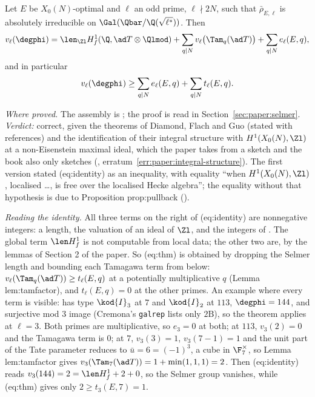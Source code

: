 \begin{sloppypar}
\begin{theorem}\label{thm:paper:main}
Let $E$ be $X_0(N)$-optimal and $\ell$ an odd prime, $\ell\nmid2N$, such that $\bar\rho_{E,\ell}$ is absolutely irreducible on $\Gal(\Qbar/\Q(\sqrt{\ell^*}))$. Then
\begin{equation}\label{eq:paper:identity}
v_\ell(\degphi)=\len_{\Zl}H^1_f(\Q,\ad T\otimes\Qlmod)+\sum_{q\mid N}v_\ell\bigl(\Tam_q(\ad T)\bigr)+\sum_{q\mid N}e_\ell(E,q),
\end{equation}
and in particular
\begin{equation}\label{eq:paper:thm}
v_\ell(\degphi)\ge\sum_{q\mid N}e_\ell(E,q)+\sum_{q\mid N}t_\ell(E,q).
\end{equation}
\end{theorem}

\noindent\emph{Where proved.} The assembly is ; the proof is read in Section~\ref{sec:paper:selmer}. \emph{Verdict:} correct, given the
theorems of Diamond, Flach and Guo (stated with references) and the identification of their integral structure with $H^1(X_0(N),\Zl)$ at a non-Eisenstein
maximal ideal, which the paper takes from a sketch and the book also only sketches (, erratum~\ref{err:paper:integral-structure}). The first
version stated (eq:identity) as an inequality, with equality ``when $H^1(X_0(N),\Zl)$, localised \dots, is free over the localised Hecke algebra''; the
equality without that hypothesis is due to Proposition prop:pullback ().

\emph{Reading the identity.} All three terms on the right of (eq:identity) are nonnegative integers: a length, the valuation of an ideal of $\Zl$, and the integers of
. The global term $\len H^1_f$ is not computable from local data; the other two are, by the lemmas of Section 2 of the paper. So (eq:thm) is
obtained by dropping the Selmer length and bounding each Tamagawa term from below: $v_\ell(\Tam_q(\ad T))\ge t_\ell(E,q)$ at a potentially multiplicative $q$ (Lemma lem:tamfactor),
and $t_\ell(E,q)=0$ at the other primes. An example where every term is visible:  has type $\kod{I}_3$ at $7$ and $\kod{I}_2$ at $113$, $\degphi=144$, and surjective mod $3$
image (Cremona's \texttt{galrep} lists only $2\mathrm B$), so the theorem applies at $\ell=3$. Both primes are multiplicative, so $e_3=0$ at both; at $113$, $v_3(2)=0$ and the Tamagawa
term is $0$; at $7$, $v_3(3)=1$, $v_3(7-1)=1$ and the unit part of the Tate parameter reduces to $\bar u=6=(-1)^3$, a cube in $\F_7^\times$, so Lemma lem:tamfactor gives
$v_3(\Tam_7(\ad T))=1+\min(1,1,1)=2$. Then (eq:identity) reads $v_3(144)=2=\len H^1_f+2+0$, so the Selmer group vanishes, while (eq:thm) gives only $2\ge t_3(E,7)=1$.


\end{sloppypar}
